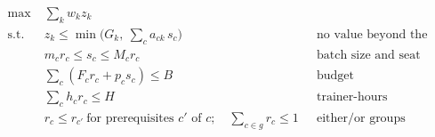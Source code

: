 \documentclass[12pt,varwidth=16cm,border=4pt]{standalone}
\begin{document}
\begin{align*}
\max \; & \textstyle\sum_k w_k z_k \\
\text{s.t. } & z_k \le \min\!\big(G_k,\ \textstyle\sum_c a_{ck}\, s_c\big) && \text{no value beyond the gap}\\
& m_c r_c \le s_c \le M_c r_c && \text{batch size and seat limits}\\
& \textstyle\sum_c (F_c r_c + p_c s_c) \le B && \text{budget}\\
& \textstyle\sum_c h_c r_c \le H && \text{trainer-hours}\\
& r_c \le r_{c'} \ \text{for prerequisites } c' \text{ of } c; \quad \textstyle\sum_{c\in g} r_c \le 1 && \text{either/or groups}
\end{align*}
\end{document}
